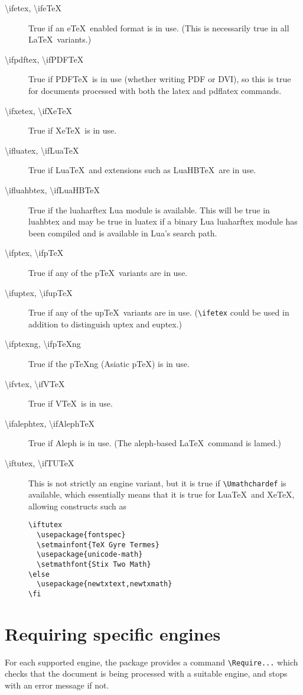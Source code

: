 \documentclass{article}
\newcommand\cs[1]{{\ttfamily\textbackslash #1}}
\begin{document}
\begin{description}
\item[\cs{ifetex},      \cs{ifeTeX}]
True if an e\TeX\ enabled format is in use. (This is necessarily true
in all \LaTeX\ variants.)
\item[\cs{ifpdftex},    \cs{ifPDFTeX}]
True if PDF\TeX\ is in use (whether writing PDF or DVI), so this is
true for documents processed with both the  \textsf{latex} and
\textsf{pdflatex} commands.
\item[\cs{ifxetex},     \cs{ifXeTeX}]
True if Xe\TeX\ is in use.
\item[\cs{ifluatex},    \cs{ifLuaTeX}]
True if Lua\TeX\ and extensions such as LuaHB\TeX\ are in use.
\item[\cs{ifluahbtex},  \cs{ifLuaHBTeX}]
True if the \textsf{luaharftex} Lua module is available.
This will be true in \textsf{luahbtex} and may be true in
\textsf{luatex} if a binary Lua \textsf{luaharftex} module has been
compiled and is available in Lua's search path.
\item[\cs{ifptex},      \cs{ifpTeX}]
True if any of the p\TeX\ variants are in use.
\item[\cs{ifuptex},     \cs{ifupTeX}]
True if any of the up\TeX\ variants are in use. (\verb|\ifetex| could
be used in addition to distinguish \textsf{uptex} and \textsf{euptex}.)
\item[\cs{ifptexng},    \cs{ifpTeXng}]
True if the p\TeX\-ng (Asiatic p\TeX) is in use.
\item[\cs{ifvtex},      \cs{ifVTeX}]
True if V\TeX\ is in use.
\item[\cs{ifalephtex},  \cs{ifAlephTeX}]
True if Aleph is in use. (The \textsf{aleph}-based \LaTeX\ command is
\textsf{lamed}.)
\item[\cs{iftutex},     \cs{ifTUTeX}]
This is not strictly an engine variant, but it is true if
\verb|\Umathchardef| is available, which essentially means that it is
true for Lua\TeX\ and Xe\TeX, allowing constructs such as
\begin{verbatim}
\iftutex
  \usepackage{fontspec}
  \setmainfont{TeX Gyre Termes}
  \usepackage{unicode-math}
  \setmathfont{Stix Two Math}
\else
  \usepackage{newtxtext,newtxmath}
\fi
\end{verbatim}

\end{description}

\section{Requiring specific engines}
For each supported engine, the package provides a command
\verb|\Require...| which checks that the document is being processed
with a suitable engine, and stops with an error message if not.
\end{document}
